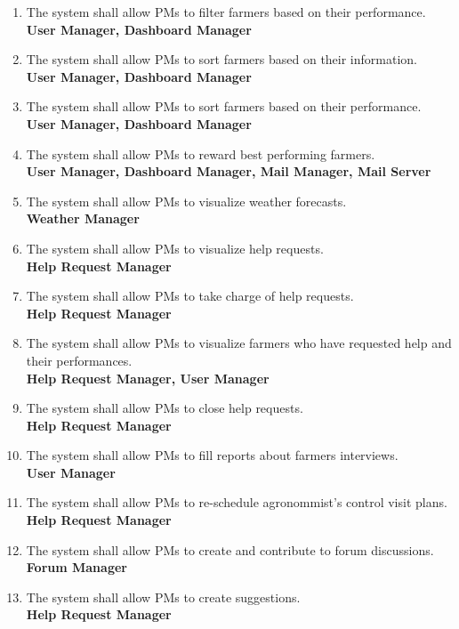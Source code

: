 \documentclass[10pt]{article} %
\begin{document}
\begin{enumerate}[label=\textbf{R\arabic*}]
    \item \label{req:pmFilter2} The system shall allow PMs to filter farmers based on their performance.    
    \\\textbf{User Manager, Dashboard Manager} 
    \item \label{req:pmSort1} The system shall allow PMs to sort farmers based on their information.    
    \\\textbf{User Manager, Dashboard Manager} 
    \item \label{req:pmSort2} The system shall allow PMs to sort farmers based on their performance.     
    \\\textbf{User Manager, Dashboard Manager} 
    \item \label{req:pmRewards} The system shall allow PMs to reward best performing farmers.    
    \\\textbf{User Manager, Dashboard Manager, Mail Manager, Mail Server} 
    \item \label{req:pmWeather} The system shall allow PMs to visualize weather forecasts.    
    \\\textbf{Weather Manager} 
    \item \label{req:pmHelp1} The system shall allow PMs to visualize help requests.
    \\\textbf{Help Request Manager} 
    \item \label{req:pmHelp2} The system shall allow PMs to take charge of help requests.
    \\\textbf{Help Request Manager} 
    \item \label{req:pmHelp3} The system shall allow PMs to visualize farmers who have requested help and their performances.
    \\\textbf{Help Request Manager, User Manager} 
    \item \label{req:pmHelp4} The system shall allow PMs to close help requests.
    \\\textbf{Help Request Manager}
    \item \label{req:pmInterview} The system shall allow PMs to fill reports about farmers interviews.    
    \\\textbf{User Manager}
    \item \label{req:pmVisits} The system shall allow PMs to re-schedule agronommist's control visit plans.    
    \\\textbf{Help Request Manager}
    \item \label{req:pmForum} The system shall allow PMs to create and contribute to forum discussions.    
    \\\textbf{Forum Manager}
    \item \label{req:pmSuggestions} The system shall allow PMs to create suggestions.
    \\\textbf{Help Request Manager}
\end{enumerate}
\newpage
\end{document}
